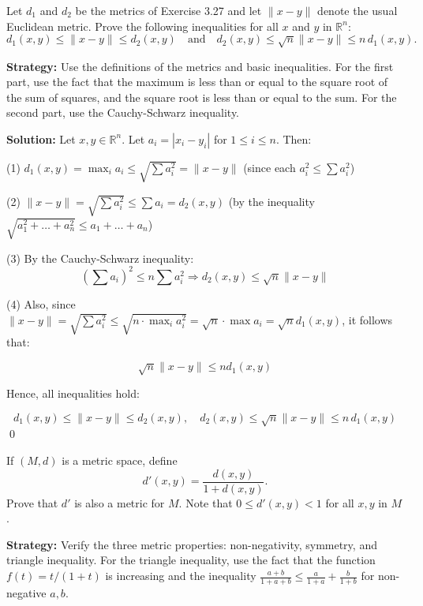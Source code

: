 \begin{problembox}
Let \( d_1 \) and \( d_2 \) be the metrics of Exercise 3.27 and let \( \|x - y\| \) denote the usual Euclidean metric. Prove the following inequalities for all \( x \) and \( y \) in \( \mathbb{R}^n \):
\[d_1(x, y) \leq \|x - y\| \leq d_2(x, y) \quad \text{and} \quad d_2(x, y) \leq \sqrt{n} \|x - y\| \leq n\,d_1(x, y).\]
\end{problembox}

\noindent\textbf{Strategy:} Use the definitions of the metrics and basic inequalities. For the first part, use the fact that the maximum is less than or equal to the square root of the sum of squares, and the square root is less than or equal to the sum. For the second part, use the Cauchy-Schwarz inequality.

\bigskip\noindent\textbf{Solution:} Let $x, y \in \mathbb{R}^n$. Let $a_i = |x_i - y_i|$ for $1 \leq i \leq n$. Then:

(1) \( d_1(x, y) = \max_i a_i \leq \sqrt{\sum a_i^2} = \|x - y\| \) (since each $a_i^2 \leq \sum a_i^2$)

(2) \( \|x - y\| = \sqrt{\sum a_i^2} \leq \sum a_i = d_2(x,y) \) (by the inequality \( \sqrt{a_1^2 + \dots + a_n^2} \leq a_1 + \dots + a_n \))

(3) By the Cauchy-Schwarz inequality:
\[
\left(\sum a_i\right)^2 \leq n \sum a_i^2 \Rightarrow d_2(x,y) \leq \sqrt{n} \|x - y\|
\]

(4) Also, since \( \|x - y\| = \sqrt{\sum a_i^2} \leq \sqrt{n \cdot \max_i a_i^2} = \sqrt{n} \cdot \max a_i = \sqrt{n} d_1(x, y) \), it follows that:

\[
\sqrt{n} \|x - y\| \leq n d_1(x, y)
\]

Hence, all inequalities hold:

\[
d_1(x,y) \leq \|x - y\| \leq d_2(x,y), \quad d_2(x, y) \leq \sqrt{n} \|x - y\| \leq n\,d_1(x, y)
\]\qed


\begin{problembox}
If \( (M, d) \) is a metric space, define
\[d'(x, y) = \frac{d(x, y)}{1 + d(x, y)}.\]
Prove that \( d' \) is also a metric for \( M \). Note that \( 0 \leq d'(x, y) < 1 \) for all \( x, y \) in \( M \).
\end{problembox}

\noindent\textbf{Strategy:} Verify the three metric properties: non-negativity, symmetry, and triangle inequality. For the triangle inequality, use the fact that the function $f(t) = t/(1+t)$ is increasing and the inequality $\frac{a+b}{1+a+b} \leq \frac{a}{1+a} + \frac{b}{1+b}$ for non-negative $a,b$.

